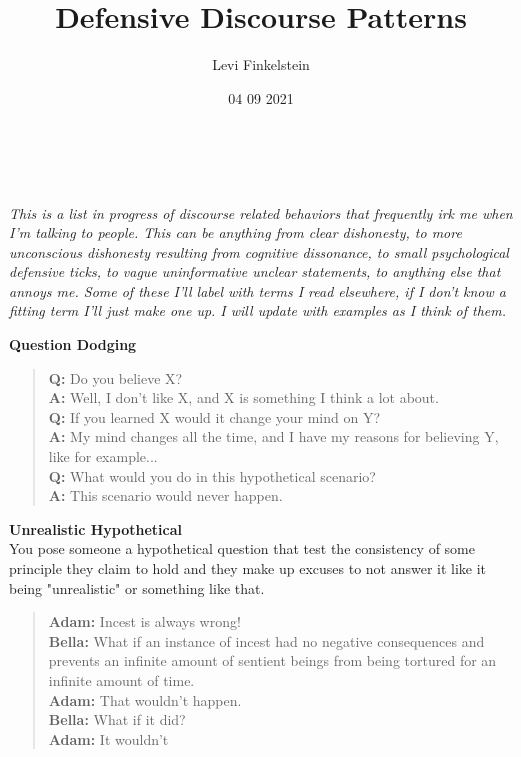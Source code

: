 \title{Defensive Discourse Patterns}
\author{Levi Finkelstein}
\date{04 09 2021}


\maketitle
\\\\
\it{This is a list in progress of discourse related behaviors that frequently irk me when I'm talking to people. This can be anything from clear dishonesty, to more unconscious dishonesty resulting from cognitive dissonance, to small  psychological defensive ticks, to vague uninformative unclear statements, to anything else that annoys me. Some of these I'll label with terms I read elsewhere, if I don't know a fitting term I'll just make one up. I will update with examples as I think of them.}
\par
\textbf{Question Dodging} 
\begin{quote}
\textbf{Q:} Do you believe X?\\ \textbf{A:} Well, I don't like X, and X is something I think a lot about. \\ \textbf{Q:} If you learned X would it change your mind on Y? \\ \textbf{A:} My mind changes all the time, and I have my reasons for believing Y, like for example...\\ \textbf{Q:} What would you do in this hypothetical scenario?\\ \textbf{A:} This scenario would never happen.\\ 
\end{quote}
\par
\textbf{Unrealistic Hypothetical}\\
You pose someone a hypothetical question that test the consistency of some principle they claim to hold and they make up excuses to not answer it like it being "unrealistic" or something like that.

\begin{quote}
\textbf{Adam:} Incest is always wrong!\\
\textbf{Bella:} What if an instance of incest had no negative consequences and prevents an infinite amount of sentient beings from being tortured for an infinite amount of time.\\
\textbf{Adam:} That wouldn't happen.\\
\textbf{Bella:} What if it did?\\
\textbf{Adam:} It wouldn't\\
\end{quote}


